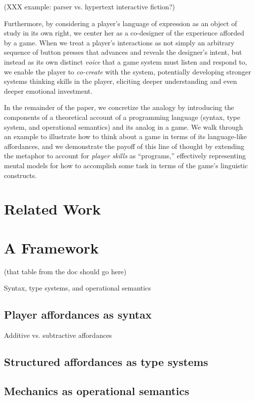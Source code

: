 \documentclass[sigconf]{acmart}
\begin{document}
(XXX example: parser vs. hypertext interactive fiction?)

Furthermore, by considering a player's language of expression as an object
of study in its own right, we center her as a co-designer of the experience
afforded by a game. When we treat a player's interactions as not simply an
arbitrary sequence of button presses that advances and reveals the
designer's intent, but instead as its own distinct {\em voice} that a game
system must listen and respond to, we enable the player to {\em co-create}
with the system, potentially developing stronger systems thinking skills in
the player, eliciting deeper understanding and even deeper emotional
investment.

In the remainder of the paper, we concretize the analogy by introducing the
components of a theoretical account of a programming language (syntax, type
system, and operational semantics) and its analog in a game. We walk
through an example to illustrate how to think about a game in terms of its
language-like affordances, and we demonstrate the payoff of this line of
thought by extending the metaphor to account for {\em player skills} as
``programs,'' effectively representing mental models for how to accomplish
some task in terms of the game's linguistic constructs.


\section{Related Work}

\section{A Framework}

  (that table from the doc should go here)

  Syntax, type systems, and operational semantics

  \subsection{Player affordances as syntax}

  Additive vs. subtractive affordances

  \subsection{Structured affordances as type systems}

  \subsection{Mechanics as operational semantics}
\end{document}

